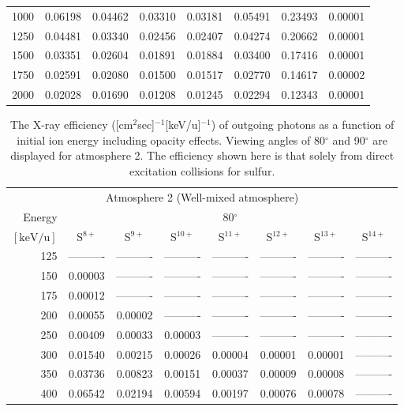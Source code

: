 \begin{table}[ht]
\begin{tabular}{r|c|c|c|c|c|c|c}
     1000 & 0.06198 & 0.04462 & 0.03310 & 0.03181 & 0.05491 & 0.23493 & 0.00001 \\
     1250 & 0.04481 & 0.03340 & 0.02456 & 0.02407 & 0.04274 & 0.20662 & 0.00001 \\
     1500 & 0.03351 & 0.02604 & 0.01891 & 0.01884 & 0.03400 & 0.17416 & 0.00001 \\
     1750 & 0.02591 & 0.02080 & 0.01500 & 0.01517 & 0.02770 & 0.14617 & 0.00002 \\
     2000 & 0.02028 & 0.01690 & 0.01208 & 0.01245 & 0.02294 & 0.12343 & 0.00001 \\ \cline{1-8}
    \end{tabular}
    \label{tab:XRayEffSDE3}
\end{table}

\begin{table}[ht]
    \centering
    \caption{The X-ray efficiency ([cm$^2$sec]$^{-1}$[keV/u]$^{-1}$) of outgoing photons as a function of initial ion energy including opacity effects. Viewing angles of 80$^\circ$ and 90$^\circ$ are displayed for atmosphere 2. The efficiency shown here is that solely from direct excitation collisions for sulfur.}
    \begin{tabular}{r|c|c|c|c|c|c|c}
    \multicolumn{8}{c}{Atmosphere 2 (Well-mixed atmosphere)} \\ \cline{2-8}
    Energy & \multicolumn{7}{c}{80$^\circ$} \\ \cline{2-8}
    $\mathrm{[keV/u]}$ & S$^{8+}$ & S$^{9+}$ & S$^{10+}$ & S$^{11+}$ & S$^{12+}$ & S$^{13+}$ & S$^{14+}$ \\ \cline{1-8}
      125 & ---------- & ---------- & ---------- & ---------- & ---------- & ---------- & ---------- \\
      150 & 0.00003 & ---------- & ---------- & ---------- & ---------- & ---------- & ---------- \\
      175 & 0.00012 & ---------- & ---------- & ---------- & ---------- & ---------- & ---------- \\
      200 & 0.00055 & 0.00002 & ---------- & ---------- & ---------- & ---------- & ---------- \\
      250 & 0.00409 & 0.00033 & 0.00003 & ---------- & ---------- & ---------- & ---------- \\
      300 & 0.01540 & 0.00215 & 0.00026 & 0.00004 & 0.00001 & 0.00001 & ---------- \\
      350 & 0.03736 & 0.00823 & 0.00151 & 0.00037 & 0.00009 & 0.00008 & ---------- \\
      400 & 0.06542 & 0.02194 & 0.00594 & 0.00197 & 0.00076 & 0.00078 & ---------- \\

\end{tabular}
\end{table}

